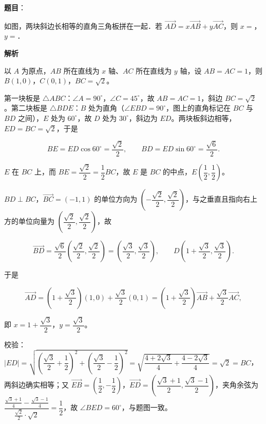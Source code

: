 \begin{answer}

\textbf{题目}：

如图，两块斜边长相等的直角三角板拼在一起．若 $\overrightarrow{AD}=x\overrightarrow{AB}+y\overrightarrow{AC}$，则 $x=$\gkblank{}，$y=$\gkblank{}．
\nopagebreak[4]
\begin{center}\end{center}
\nopagebreak[4]
\textbf{解析}

以 $A$ 为原点，$AB$ 所在直线为 $x$ 轴、$AC$ 所在直线为 $y$ 轴，设 $AB=AC=1$，则 $B(1,0)$，$C(0,1)$，$BC=\sqrt2$。

第一块板是 $\triangle ABC$：$\angle A=90^\circ$，$\angle C=45^\circ$，故 $AB=AC=1$，斜边 $BC=\sqrt2$。第二块板是 $\triangle BDE$：$B$ 处为直角（$\angle EBD=90^\circ$，图上的直角标记在 $BC$ 与 $BD$ 之间），$E$ 处为 $60^\circ$，故 $D$ 处为 $30^\circ$，斜边为 $ED$。两块板斜边相等，$ED=BC=\sqrt2$，于是

\nopagebreak[4]
\[BE=ED\cos60^\circ=\frac{\sqrt2}{2},\qquad BD=ED\sin60^\circ=\frac{\sqrt6}{2}.\]

$E$ 在 $BC$ 上，而 $BE=\dfrac{\sqrt2}{2}=\dfrac12BC$，故 $E$ 是 $BC$ 的中点，$E\left(\dfrac12,\dfrac12\right)$。

$BD\perp BC$，$\overrightarrow{BC}=(-1,1)$ 的单位方向为 $\left(-\dfrac{\sqrt2}{2},\dfrac{\sqrt2}{2}\right)$，与之垂直且指向右上方的单位向量为 $\left(\dfrac{\sqrt2}{2},\dfrac{\sqrt2}{2}\right)$，故

\nopagebreak[4]
\[\overrightarrow{BD}=\frac{\sqrt6}{2}\left(\frac{\sqrt2}{2},\frac{\sqrt2}{2}\right)=\left(\frac{\sqrt3}{2},\frac{\sqrt3}{2}\right),\qquad D\left(1+\frac{\sqrt3}{2},\frac{\sqrt3}{2}\right).\]

于是

\nopagebreak[4]
\[\overrightarrow{AD}=\left(1+\frac{\sqrt3}{2}\right)(1,0)+\frac{\sqrt3}{2}(0,1)=\left(1+\frac{\sqrt3}{2}\right)\overrightarrow{AB}+\frac{\sqrt3}{2}\overrightarrow{AC},\]

即 $x=1+\dfrac{\sqrt3}{2}$，$y=\dfrac{\sqrt3}{2}$。

校验：$|ED|=\sqrt{\left(\dfrac{\sqrt3}{2}+\dfrac12\right)^2+\left(\dfrac{\sqrt3}{2}-\dfrac12\right)^2}=\sqrt{\dfrac{4+2\sqrt3}{4}+\dfrac{4-2\sqrt3}{4}}=\sqrt2=BC$，两斜边确实相等；又 $\overrightarrow{EB}=\left(\dfrac12,-\dfrac12\right)$，$\overrightarrow{ED}=\left(\dfrac{\sqrt3+1}{2},\dfrac{\sqrt3-1}{2}\right)$，夹角余弦为 $\dfrac{\frac{\sqrt3+1}{4}-\frac{\sqrt3-1}{4}}{\frac{\sqrt2}{2}\cdot\sqrt2}=\dfrac12$，故 $\angle BED=60^\circ$，与题图一致。


\end{answer}
